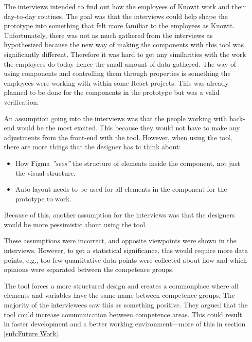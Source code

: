 The interviews intended to find out how the employees of Knowit work and their day-to-day routines. The goal was that the interviews could help shape the prototype into something that felt more familiar to the employees as Knowit. Unfortunately, there was not as much gathered from the interviews as hypothesized because the new way of making the components with this tool was significantly different. Therefore it was hard to get any similarities with the work the employees do today hence the small amount of data gathered. The way of using components and controlling them through properties is something the employees were working with within some React projects. This was already planned to be done for the components in the prototype but was a valid verification. 

An assumption going into the interviews was that the people working with back-end would be the most excited. This because they would not have to make any adjustments from the front-end with the tool. However, when using the tool, there are more things that the designer has to think about:
\begin{itemize}
  \item How Figma \textit{''sees''} the structure of elements inside the component, not just the visual structure.
  \item Auto-layout needs to be used for all elements in the component for the prototype to work. 
\end{itemize}

Because of this, another assumption for the interviews was that the designers would be more pessimistic about using the tool. 


These assumptions were incorrect, and opposite viewpoints were shown in the interviews. However, to get a statistical significance, this would require more data points, e.g., too few quantitative data points were collected about how and which opinions were separated between the competence groups. 

 The tool forces a more structured design and creates a commonplace where all elements and variables have the same name between competence groups. The majority of the interviewees saw this as something positive. They argued that the tool could increase communication between competence areas. This could result in faster development and a better working environment—more of this in section \ref{sub:Future Work}.

